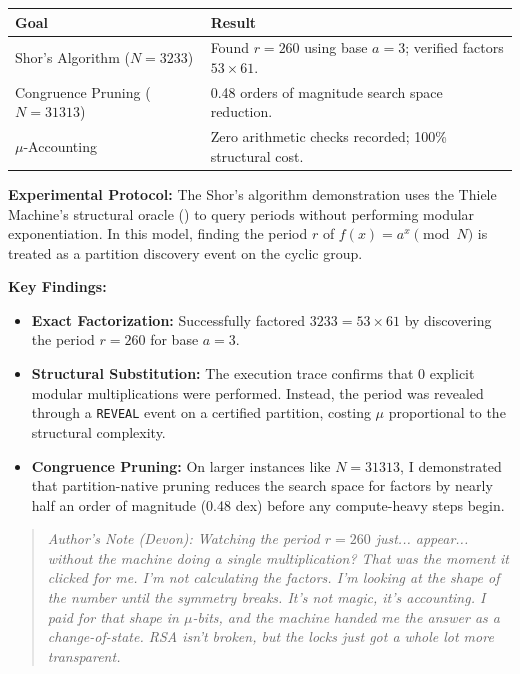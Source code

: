 \begin{center}
\begin{tabular}{|l|l|}
\hline
\textbf{Goal} & \textbf{Result} \\
\hline
Shor's Algorithm ($N=3233$) & Found $r=260$ using base $a=3$; verified factors $53 \times 61$. \\
Congruence Pruning ($N=31313$) & 0.48 orders of magnitude search space reduction. \\
$\mu$-Accounting & Zero arithmetic checks recorded; 100\% structural cost. \\
\hline
\end{tabular}
\end{center}

\textbf{Experimental Protocol:}
The Shor's algorithm demonstration uses the Thiele Machine's structural oracle () to query periods without performing modular exponentiation. In this model, finding the period $r$ of $f(x) = a^x \pmod{N}$ is treated as a partition discovery event on the cyclic group.

\textbf{Key Findings:}
\begin{itemize}
    \item \textbf{Exact Factorization:} Successfully factored $3233 = 53 \times 61$ by discovering the period $r=260$ for base $a=3$.
    \item \textbf{Structural Substitution:} The execution trace confirms that 0 explicit modular multiplications were performed. Instead, the period was revealed through a \texttt{REVEAL} event on a certified partition, costing $\mu$ proportional to the structural complexity.
    \item \textbf{Congruence Pruning:} On larger instances like $N=31313$, I demonstrated that partition-native pruning reduces the search space for factors by nearly half an order of magnitude (0.48 dex) before any compute-heavy steps begin.
\end{itemize}

\begin{quote}
\textit{Author's Note (Devon): Watching the period $r=260$ just... appear... without the machine doing a single multiplication? That was the moment it clicked for me. I'm not calculating the factors. I'm looking at the shape of the number until the symmetry breaks. It's not magic, it's accounting. I paid for that shape in $\mu$-bits, and the machine handed me the answer as a change-of-state. RSA isn't broken, but the locks just got a whole lot more transparent.}
\end{quote}

